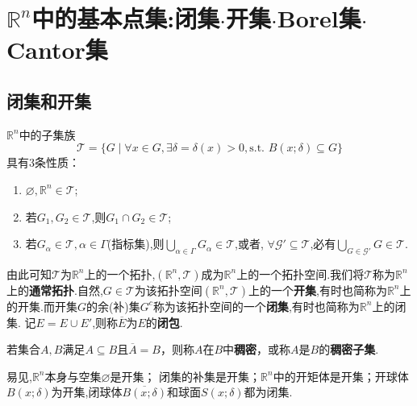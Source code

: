 \documentclass[../../main.tex]{subfiles}%
\begin{document}
\section{$\mathbb{R}^n$中的基本点集:闭集$\cdot$开集$\cdot$Borel集$\cdot$Cantor集}

\subsection{闭集和开集}

\begin{lemma}
$\mathbb{R}^n$中的子集族
\[
\mathscr{T}=\{G\mid \forall x\in G,\exists \delta=\delta(x)>0,\text{s.t. }B(x;\delta)\subseteq G\}
\]
具有3条性质：
\begin{enumerate}[(1)]
\item $\varnothing,\mathbb{R}^n\in\mathscr{T}$;
\item 若$G_1,G_2\in\mathscr{T}$,则$G_1\cap G_2\in\mathscr{T}$;
\item 若$G_\alpha\in\mathscr{T},\alpha\in\Gamma$(指标集),则$\bigcup_{\alpha\in\Gamma}G_\alpha\in\mathscr{T}$,或者, $\forall\mathscr{G}'\subseteq\mathscr{T}$,必有$\bigcup_{G\in\mathscr{G}'}G\in\mathscr{T}$.
\end{enumerate}
由此可知$\mathscr{T}$为$\mathbb{R}^n$上的一个拓扑,$(\mathbb{R}^n,\mathscr{T})$成为$\mathbb{R}^n$上的一个拓扑空间.我们将$\mathscr{T}$称为$\mathbb{R}^n$上的\textbf{通常拓扑}.自然,$G\in\mathscr{T}$为该拓扑空间$(\mathbb{R}^n,\mathscr{T})$上的一个\textbf{开集},有时也简称为$\mathbb{R}^n$上的开集.而开集$G$的余(补)集$G^c$称为该拓扑空间的一个\textbf{闭集},有时也简称为$\mathbb{R}^n$上的闭集.
记$E=E\cup E'$,则称\(\overline{E}\)为\(E\)的\textbf{闭包}.

若集合$A,B$满足\(A\subseteq B\)且\(\overline{A}=B\)，则称\(A\)在\(B\)中\textbf{稠密}，或称\(A\)是\(B\)的\textbf{稠密子集}.
\end{lemma}
\begin{remark}
易见,\(\mathbb{R}^n\)本身与空集\(\varnothing\)是开集；
闭集的补集是开集；\(\mathbb{R}^n\)中的开矩体是开集；开球体$B(x;\delta)$为开集,闭球体$\overline{B(x;\delta)}$和球面$S(x;\delta)$都为闭集.
\end{remark}
\end{document}
